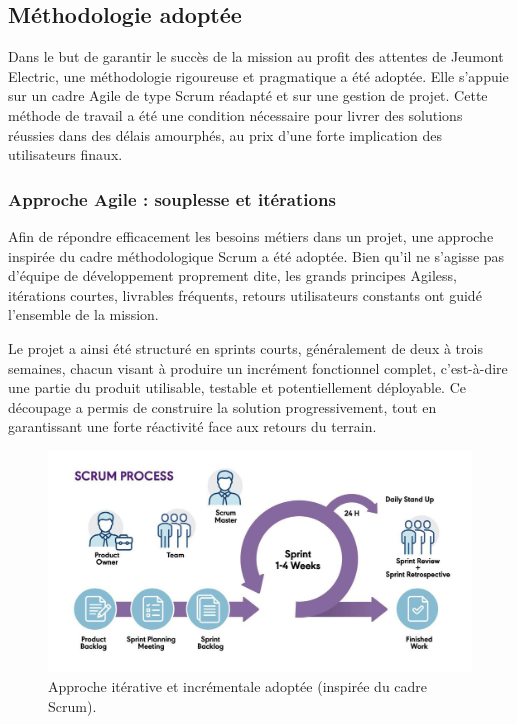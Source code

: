 \documentclass[11pt,a4paper]{article}
\begin{document}
\subsection{Méthodologie adoptée}

Dans le but de garantir le succès de la mission au profit des attentes de Jeumont Electric, une méthodologie rigoureuse et pragmatique a été adoptée. Elle s’appuie sur un cadre Agile de type Scrum réadapté et sur une gestion de projet.
Cette méthode de travail a été une condition nécessaire pour livrer des solutions réussies dans des délais amourphés, au prix d’une forte implication des utilisateurs finaux.

\subsubsection{Approche Agile : souplesse et itérations}

Afin de répondre efficacement les besoins métiers dans un projet, une approche inspirée du cadre méthodologique Scrum a été adoptée. Bien qu’il ne s’agisse pas d’équipe de développement proprement dite, les grands principes Agiless, itérations courtes, livrables fréquents, retours utilisateurs constants ont guidé l’ensemble de la mission.

Le projet a ainsi été structuré en sprints courts, généralement de deux à trois semaines, chacun visant à produire un incrément fonctionnel complet, c’est-à-dire une partie du produit utilisable, testable et potentiellement déployable. Ce découpage a permis de construire la solution progressivement, tout en garantissant une forte réactivité face aux retours du terrain.

\begin{figure}[H]
    \centering
    \includegraphics[width=\textwidth]{../Images/scrum.jpg}
    \caption{Approche itérative et incrémentale adoptée (inspirée du cadre Scrum).}
\end{figure}
\end{document}
